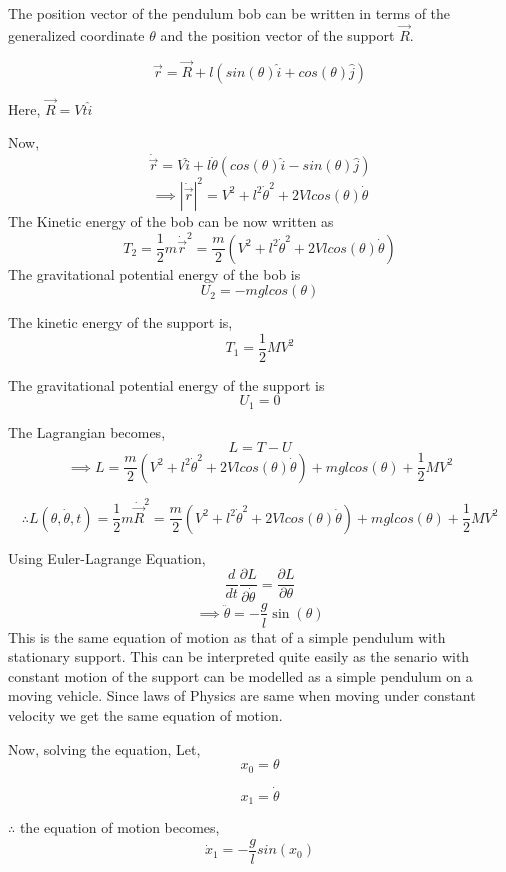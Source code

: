 \documentclass{article}
\begin{document}
	
	The position vector of the pendulum bob can be written in terms of the generalized coordinate $\theta$ and the position vector of the support $ \vec{R} $.
	
	\[ \vec{r} = \vec{R} + l(sin(\theta) \hat{i} + cos(\theta) \hat{j} )\]
	
	Here, $ \vec{R} = Vt\hat{i} $
	
	Now,
	\[ \dot{\vec{r}}  = V\hat{i} + l\dot{\theta}( cos(\theta) \hat{i} - sin(\theta)\hat{j} )\]
	\[ \implies |\dot{\vec{r}}|^2 = V^2 + l^2\dot{\theta}^2 + 2Vlcos(\theta)\dot{\theta} \]	
	The Kinetic energy of the bob can be now written as 
	\[ 
	T_2 = \frac{1}{2}m\dot{\vec{r}}^2 = \frac{m}{2}(V^2 + l^2\dot{\theta}^2 + 2Vlcos(\theta)\dot{\theta})
	 \]
	 The gravitational potential energy of the bob is
	 \[ U_2 = -mglcos(\theta) \]
	 
	 The kinetic energy of the support is,
	 \[
	 T_1 = \frac{1}{2}MV^2 
	  \]
	  
	  The gravitational potential energy of the support is
	  \[ U_1 = 0\]
	 
	 The Lagrangian becomes,
	 \[ L = T- U \]
	 \[ \implies L  = \frac{m}{2}(V^2 + l^2\dot{\theta}^2 + 2Vlcos(\theta)\dot{\theta}) + mglcos(\theta) + \frac{1}{2}MV^2  \]
	
	\[ \therefore  L(\theta,\dot{\theta},t) = \frac{1}{2}m\dot{\vec{R}}^2 = \frac{m}{2}(V^2 + l^2\dot{\theta}^2 + 2Vlcos(\theta)\dot{\theta}) + mglcos(\theta) + \frac{1}{2}MV^2 \]
	
	Using Euler-Lagrange Equation,
	\[ \frac{d}{dt}\frac{\partial L}{\partial \dot{\theta}} = \frac{\partial L}{\partial \theta} \]
	\[ \implies \ddot{\theta} = -\frac{g}{l}\sin(\theta)  \]
	This is the same equation of motion as that of a simple pendulum with stationary support. This can be interpreted quite easily as the senario with constant motion of the support can be modelled as a simple pendulum on a moving vehicle. Since laws of Physics are same when moving under constant velocity we get the same equation of motion.
	
	Now, solving the equation,
	Let,
	\begin{equation}
		x_0 = \theta 	
	\end{equation}

	\begin{equation}\label{key}
		x_1 = \dot{\theta}
	\end{equation}

	$\therefore$ the equation of motion becomes,
	\[  \dot x_1 = -\frac{g}{l}sin(x_0) \]
	
\end{document}
